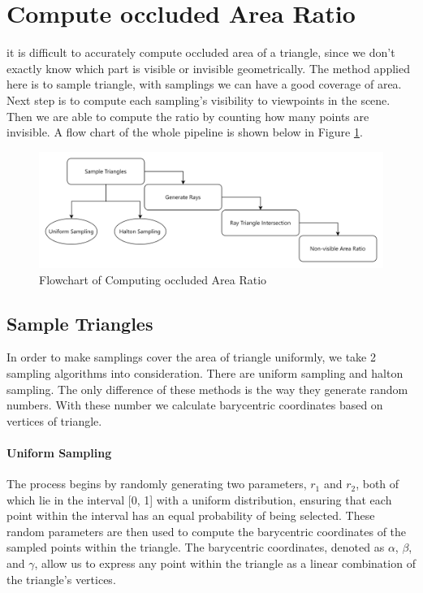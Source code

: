 \documentclass[11pt, a4paper,oneside,chapterprefix=false]{scrbook}
\begin{document}
\section{Compute occluded Area Ratio} \label{sec:compute occluded area ratio}

it is difficult to accurately compute occluded area of a triangle, since we don't exactly know which part is visible or invisible geometrically. The method applied here is to sample triangle, with samplings we can have a good coverage of area. Next step is to compute each sampling's visibility to viewpoints in the scene. Then we are able to compute the ratio by counting how many points are invisible. A flow chart of the whole pipeline is shown below in Figure \ref{fig:flowchart of computing occluded area ratio}.

\begin{figure}[H]
    \centering
    \includegraphics*[width=1.0\textwidth]{figures/Compute occluded Area Ratio.png}
    \caption{Flowchart of Computing occluded Area Ratio}
    \label{fig:flowchart of computing occluded area ratio}
\end{figure}

\subsection{Sample Triangles} \label{subsec:sample triangle}

In order to make samplings cover the area of triangle uniformly, we take 2 sampling algorithms into consideration. There are uniform sampling and halton sampling. The only difference of these methods is the way they generate random numbers. With these number we calculate barycentric coordinates based on vertices of triangle. 

\paragraph{Uniform Sampling}

The process begins by randomly generating two parameters, \( r_1 \) and \( r_2 \), both of which lie in the interval [0, 1] with a uniform distribution, ensuring that each point within the interval has an equal probability of being selected. These random parameters are then used to compute the barycentric coordinates of the sampled points within the triangle. The barycentric coordinates, denoted as \( \alpha \), \( \beta \), and \( \gamma \), allow us to express any point within the triangle as a linear combination of the triangle's vertices.
\end{document}
